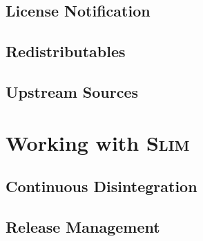 \documentclass[a4paper,10pt]{article}
\newcommand{\slim}{\textsc{Slim}\xspace}
\begin{document}
\subsection{License Notification}
\subsection{Redistributables}
\subsection{Upstream Sources}

\section{Working with \slim}
\subsection{Continuous Disintegration}
\subsection{Release Management}



\end{document}
